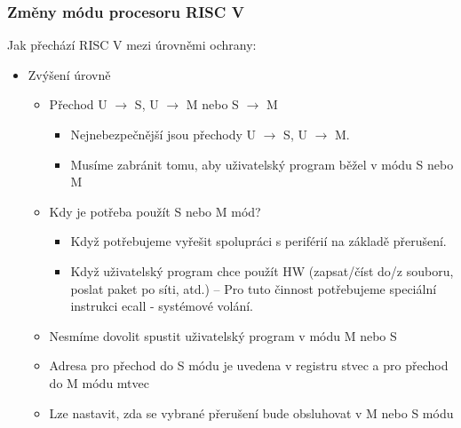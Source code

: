 \documentclass[aspectratio=169]{beamer}
\begin{document}
\begin{frame}
\frametitle{Změny módu procesoru RISC V}

Jak přechází RISC V mezi úrovněmi ochrany:
\begin{itemize}
\item Zvýšení úrovně
\begin{itemize}
\item Přechod U $\rightarrow$ S, U $\rightarrow$ M nebo S $\rightarrow$ M
\begin{itemize}
\item Nejnebezpečnější jsou přechody U $\rightarrow$ S, U $\rightarrow$ M.
\item Musíme zabránit tomu, aby uživatelský program běžel v módu S nebo M
\end{itemize}
\item Kdy je potřeba použít S nebo M mód?
\begin{itemize}
\item Když potřebujeme vyřešit spolupráci s periférií na základě přerušení.
\item Když uživatelský program chce použít HW (zapsat/číst do/z souboru, poslat paket po síti, atd.) --
Pro tuto činnost potřebujeme speciální instrukci ecall - systémové volání.
\end{itemize}
\item Nesmíme dovolit spustit uživatelský program v módu M nebo S
\item Adresa pro přechod do S módu je uvedena v registru stvec a pro přechod do M módu mtvec
\item Lze nastavit, zda se vybrané přerušení bude obsluhovat v M nebo S módu
\end{itemize}
\end{itemize}

\end{frame}
\end{document}
